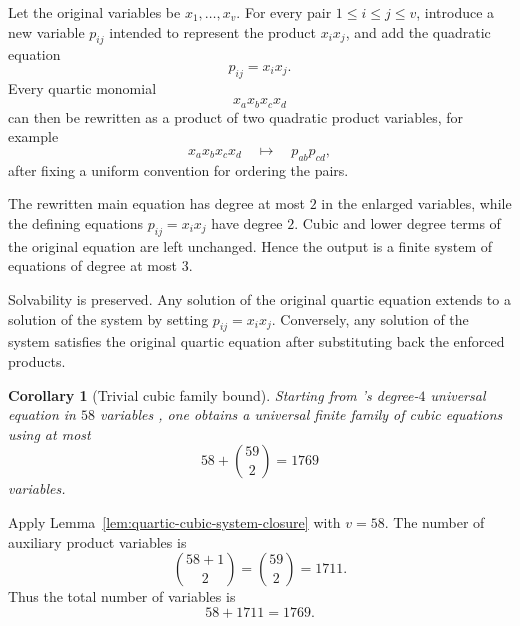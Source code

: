 \documentclass[letterpaper,10pt]{article}
\makeatletter
\theoremstyle{upright}
\theoremstyle{upright}
\newtheorem{corollary}[theorem]{Corollary}
\renewenvironment{proof}[1][Proof]{%
	\par\pushQED{\qed}%
	\normalfont
	\topsep6\p@\@plus6\p@\relax
	\trivlist
	\item[\hskip\labelsep\slshape #1\@addpunct{.}]%
}{%
	\popQED\endtrivlist\@endpefalse
}
\makeatother
\begin{document}
\begin{proof}[Proof sketch]
	Let the original variables be $x_1,\ldots,x_v$. For every pair
	$1\le i\le j\le v$, introduce a new variable $p_{ij}$ intended to represent the product $x_i x_j$, and add the quadratic equation
	\begin{equation}
		p_{ij}=x_i x_j.
	\end{equation}
	Every quartic monomial
	\begin{equation}
		x_a x_b x_c x_d
	\end{equation}
	can then be rewritten as a product of two quadratic product variables, for example
	\begin{equation}
		x_a x_b x_c x_d
		\quad\longmapsto\quad
		p_{ab}p_{cd},
	\end{equation}
	after fixing a uniform convention for ordering the pairs.

	The rewritten main equation has degree at most $2$ in the enlarged variables, while the defining equations $p_{ij}=x_i x_j$ have degree $2$. Cubic and lower degree terms of the original equation are left unchanged. Hence the output is a finite system of equations of degree at most $3$.

	Solvability is preserved. Any solution of the original quartic equation extends to a solution of the system by setting $p_{ij}=x_i x_j$. Conversely, any solution of the system satisfies the original quartic equation after substituting back the enforced products.
\end{proof}

\begin{corollary}[Trivial cubic family bound]
\label{cor:trivial-cubic-family-bound}
	Starting from \citeauthor{jones82}'s degree-$4$ universal equation in $58$ variables \citep{jones80,jones82}, one obtains a universal finite family of cubic equations using at most
	\begin{equation}
		58+\binom{59}{2}=1769
	\end{equation}
	variables.
\end{corollary}

\begin{proof}
	Apply Lemma~\ref{lem:quartic-cubic-system-closure} with $v=58$. The number of auxiliary product variables is
	\begin{equation}
		\binom{58+1}{2}
		=
		\binom{59}{2}
		=
		1711.
	\end{equation}
	Thus the total number of variables is
	\begin{equation}
		58+1711=1769.
	\end{equation}
\end{proof}
\end{document}
